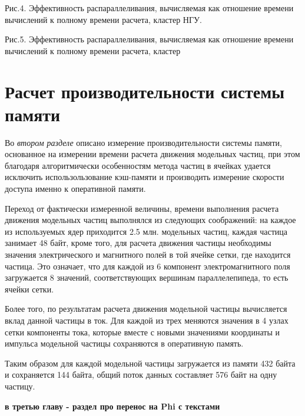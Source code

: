 Рис.4. Эффективность распараллеливания, вычисляемая как отношение времени вычислений к полному времени расчета, кластер НГУ.

Рис.5. Эффективность распараллеливания, вычисляемая как отношение времени вычислений к полному времени расчета, кластер 





\section{Расчет производительности системы памяти}
Во \textit{втором разделе} описано измерение производительности системы памяти, основанное на измерении времени расчета движения модельных частиц, при этом благодаря алгоритмически особенностям метода частиц в ячейках удается исключить использользование кэш-памяти и производить измерение скорости доступа именно к оперативной памяти.

Переход от фактически измеренной величины, времени выполнения расчета движения модельных частиц выполнялся из следующих соображений: на каждое из используемых ядер приходится 2.5 млн. модельных частиц, каждая частица занимает 48 байт, кроме того, для расчета движения частицы необходимы значения электрического и магнитного полей в той ячейке сетки, где находится частица. Это означает, что для каждой из 6 компонент электромагнитного поля загружается 8 значений, соответствующих вершинам параллелепипеда, то есть ячейки сетки. 

Более того, по результатам расчета движения модельной частицы вычисляется вклад данной частицы в ток. Для каждой из трех меняются значения в 4 узлах сетки компоненты тока, которые вместе с новыми значениями координаты и импульса модельной частицы сохраняются в оперативную память.

Таким образом для каждой модельной частицы загружается из памяти 432 байта и сохраняется 144 байта, общий поток данных составляет 576 байт на одну частицу.

\textbf{в третью главу - раздел про перенос на Phi с текстами}



